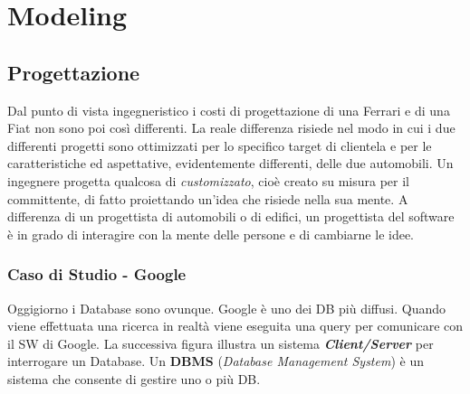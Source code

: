 
\chapter{Modeling}
\label{cap:mdlng}

\section{Progettazione}

Dal punto di vista ingegneristico i costi di progettazione di una Ferrari e di una Fiat non sono poi così differenti. La reale differenza risiede nel modo in cui i due differenti progetti sono ottimizzati per lo specifico target di clientela e per le caratteristiche ed aspettative, evidentemente differenti, delle due automobili. Un ingegnere progetta qualcosa di \textit{customizzato}, cioè creato su misura per il committente, di fatto proiettando un’idea che risiede nella sua mente. A differenza di un progettista di automobili o di edifici, un progettista del software è in grado di interagire con la mente delle persone e di cambiarne le idee. 

\subsection{Caso di Studio - Google}

Oggigiorno i Database sono ovunque. Google è uno dei DB più diffusi. Quando viene effettuata una ricerca in realtà viene eseguita una query per comunicare con il SW di Google. La successiva figura illustra un sistema \textbf{\textit{Client/Server}} per interrogare un Database. Un \textbf{DBMS} (\textit{Database Management System}) è un sistema che consente di gestire uno o più DB.

